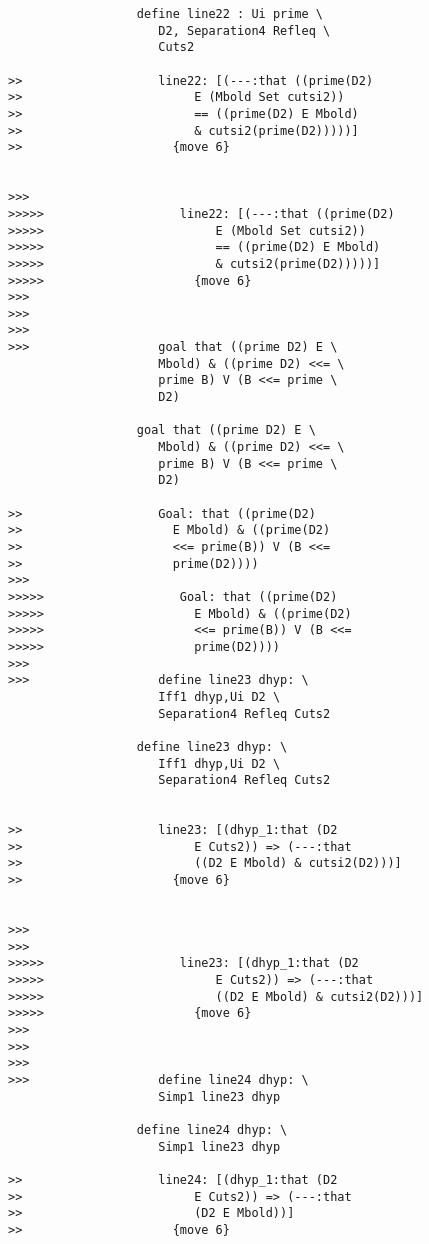 \documentclass[12pt]{article}
\begin{document}
\begin{verbatim}
                  define line22 : Ui prime \
                     D2, Separation4 Refleq \
                     Cuts2

>>                   line22: [(---:that ((prime(D2)
>>                        E (Mbold Set cutsi2))
>>                        == ((prime(D2) E Mbold)
>>                        & cutsi2(prime(D2)))))]
>>                     {move 6}


>>>
>>>>>                   line22: [(---:that ((prime(D2)
>>>>>                        E (Mbold Set cutsi2))
>>>>>                        == ((prime(D2) E Mbold)
>>>>>                        & cutsi2(prime(D2)))))]
>>>>>                     {move 6}
>>>
>>>
>>>
>>>                  goal that ((prime D2) E \
                     Mbold) & ((prime D2) <<= \
                     prime B) V (B <<= prime \
                     D2)

                  goal that ((prime D2) E \
                     Mbold) & ((prime D2) <<= \
                     prime B) V (B <<= prime \
                     D2)

>>                   Goal: that ((prime(D2)
>>                     E Mbold) & ((prime(D2)
>>                     <<= prime(B)) V (B <<=
>>                     prime(D2))))
>>>
>>>>>                   Goal: that ((prime(D2)
>>>>>                     E Mbold) & ((prime(D2)
>>>>>                     <<= prime(B)) V (B <<=
>>>>>                     prime(D2))))
>>>
>>>                  define line23 dhyp: \
                     Iff1 dhyp,Ui D2 \
                     Separation4 Refleq Cuts2

                  define line23 dhyp: \
                     Iff1 dhyp,Ui D2 \
                     Separation4 Refleq Cuts2


>>                   line23: [(dhyp_1:that (D2
>>                        E Cuts2)) => (---:that
>>                        ((D2 E Mbold) & cutsi2(D2)))]
>>                     {move 6}


>>>
>>>
>>>>>                   line23: [(dhyp_1:that (D2
>>>>>                        E Cuts2)) => (---:that
>>>>>                        ((D2 E Mbold) & cutsi2(D2)))]
>>>>>                     {move 6}
>>>
>>>
>>>
>>>                  define line24 dhyp: \
                     Simp1 line23 dhyp

                  define line24 dhyp: \
                     Simp1 line23 dhyp

>>                   line24: [(dhyp_1:that (D2
>>                        E Cuts2)) => (---:that
>>                        (D2 E Mbold))]
>>                     {move 6}



\end{verbatim}
\end{document}

